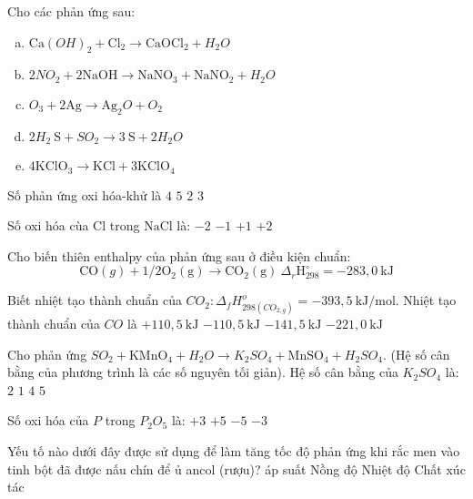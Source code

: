 \begin{ex}
	Cho các phản ứng sau:
	\begin{enumerate}[(a)]
	\item $\mathrm{Ca}(OH)_2+\mathrm{Cl}_2\to \mathrm{CaOCl}_2+H_2O$
	\item $2NO_2+2\mathrm{NaOH} \to \mathrm{NaNO}_3+\mathrm{NaNO}_2+H_2O$
	\item $O_3+2\mathrm{Ag} \to \mathrm{Ag}_2O+O_2$
	\item $2H_2\mathrm{~S}+SO_2\to 3\mathrm{~S}+2H_2O$
	\item $4\mathrm{KClO}_3\to \mathrm{KCl}+3\mathrm{KClO}_4$
	\end{enumerate}
	Số phản ứng oxi hóa-khử là
	\choice
	{$4$}
	{$5$}
	{$2$}
	{$3$}
	\loigiai{}
\end{ex}
\begin{ex}
	Số oxi hóa cùa $\mathrm{Cl}$ trong $\mathrm{NaCl}$ là:
	\choice
	{$-2$}
	{$-1$}
	{$+1$}
	{$+2$}
	\loigiai{}
\end{ex}
\begin{ex}
	Cho biến thiên enthalpy của phản ứng sau ở điều kiện chuẩn:
	$$
	\mathrm{CO}(g)+1 / 2\mathrm{O}_2(\mathrm{g}) \to \mathrm{CO}_2(\mathrm{g})\ \Delta_r \mathrm{H}_{298}^{\circ}=-283,0 \mathrm{~kJ}
	$$
	
	Biết nhiệt tạo thành chuẩn của $CO_2: \Delta_f H_{298\left(CO_{2, g}\right)}^o=-393,5\mathrm{~kJ} / \mathrm{mol}$. Nhiệt tạo thành chuẩn của $CO$ là
	\choice
	{$+110,5\mathrm{~kJ}$}
	{$-110,5\mathrm{~kJ}$}
	{$-141,5\mathrm{~kJ}$}
	{$-221,0\mathrm{~kJ}$}
	\loigiai{}
\end{ex}
\begin{ex}
	Cho phản ứng $SO_2+\mathrm{KMnO}_4+H_2O\to K_2SO_4+\mathrm{MnSO}_4+H_2SO_4$. (Hệ số cân bằng của phương trình là các số nguyên tối giản). Hệ số cân bằng của $K_2SO_4$ là:
	\choice
	{$2$}
	{$1$}
	{$4$}
	{$5$}
	\loigiai{}
\end{ex}
\begin{ex}
	Số oxi hóa của $P$ trong $P_2O_5$ là:
	\choice
	{$+3$}
	{$+5$}
	{$-5$}
	{$-3$}
	\loigiai{}
\end{ex}
\begin{ex}
	Yếu tố nào dưới đây được sử dụng để làm tăng tốc độ phản ứng khi rắc men vào tinh bột đã được nấu chín để ủ ancol (rượu)?
	\choice
	{áp suất}
	{Nồng độ}
	{Nhiệt độ}
	{Chất xúc tác}
	\loigiai{}
\end{ex}
